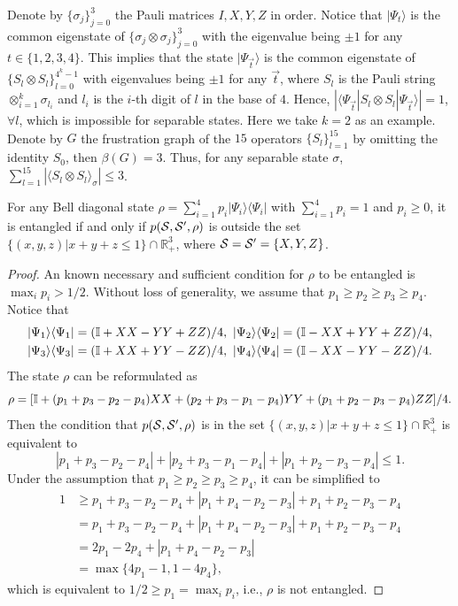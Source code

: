 Denote by $\{\sigma_j\}_{j=0}^3$ the Pauli matrices $I, X, Y, Z$ in order.
Notice that $|\Psi_t\rangle$ is the common eigenstate of $\{\sigma_j\otimes\sigma_j\}_{j=0}^3$ with the eigenvalue being $\pm 1$ for any $t\in \{1,2,3,4\}$.
This implies that the state $|\Psi_{\vec{t}}\rangle$ is the common eigenstate of $\{S_l\otimes S_l\}_{l=0}^{4^k-1}$ with eigenvalues being $\pm 1$ for any $\vec{t}$, where $S_l$ is the Pauli string $\otimes_{i=1}^k \sigma_{l_i}$ and $l_i$ is the $i$-th digit of $l$ in the base of $4$.
Hence, $|\langle \Psi_{\vec{t}}| S_l\otimes S_l|\Psi_{\vec{t}}\rangle| = 1$, $\forall l$, which is impossible for separable states. Here we take $k=2$ as an example. Denote by $G$ the frustration graph of the $15$ operators $\{S_l\}_{l=1}^{15}$ by omitting the identity $S_0$, then $\beta(G)=3$. Thus, for any separable state $\sigma$, $\sum_{l=1}^{15} |\langle S_l\otimes S_l\rangle_{\sigma}| \le 3$.
\begin{theorem}
	For any Bell diagonal state $\rho = \sum_{i=1}^4 p_i |\Psi_i\rangle\langle \Psi_i|$ with $\sum_{i=1}^4 p_i = 1$ and $p_i \ge 0$, it is entangled if and only if $p({\cal S}, {\cal S}', \rho)$ is outside the set $\{(x,y,z)|x+y+z\le 1\} \cap \mathbb{R}^3_+$, where ${\cal S} = {\cal S'} = \{X, Y, Z\}$.
\end{theorem}
\begin{proof}
An known necessary and sufficient condition for $\rho$ to be entangled is $\max_i p_i > 1/2$. Without loss of generality, we assume that $p_1 \ge p_2 \ge p_3 \ge p_4$.
Notice that
\begin{align}
	|\Psi_1\rangle\langle \Psi_1| = (\id + XX - YY + Z Z)/4, \ 
	|\Psi_2\rangle\langle \Psi_2| = (\id - XX + YY + Z Z)/4, \nonumber\\
	|\Psi_3\rangle\langle \Psi_3| = (\id + XX + YY - Z Z)/4, \ 
	|\Psi_4\rangle\langle \Psi_4| = (\id - XX - YY - Z Z)/4.
\end{align}
The state $\rho$ can be reformulated as
\begin{equation}
	\rho = [\mathbb{I} + (p_1+p_3-p_2-p_4)XX + (p_2+p_3-p_1-p_4)YY + (p_1+p_2-p_3-p_4)Z Z]/4.
\end{equation}
Then the condition that $p({\cal S}, {\cal S}', \rho)$ is in the set $\{(x,y,z)|x+y+z\le 1\} \cap \mathbb{R}^3_+$  is equivalent to
\begin{equation}
	|p_1+p_3-p_2-p_4| + |p_2+p_3-p_1-p_4| + |p_1+p_2-p_3-p_4| \le 1.
\end{equation}
Under the assumption that $p_1\ge p_2 \ge p_3 \ge p_4$, it can be simplified to
\begin{align}
	1 &\ge p_1+p_3-p_2-p_4 + |p_1+p_4 - p_2 -p_3| + p_1 + p_2 - p_3 -p_4\nonumber\\
	  &= p_1+p_3-p_2-p_4 + |p_1+p_4 - p_2 -p_3| + p_1 + p_2 - p_3 -p_4\nonumber\\
	  &= 2p_1-2p_4 + |p_1+p_4-p_2-p_3|\nonumber\\
	  &= \max \{4p_1-1,1-4p_4\},
\end{align}
which is equivalent to $1/2 \ge p_1 = \max_i p_i$, i.e., $\rho$ is not entangled.
\end{proof}
